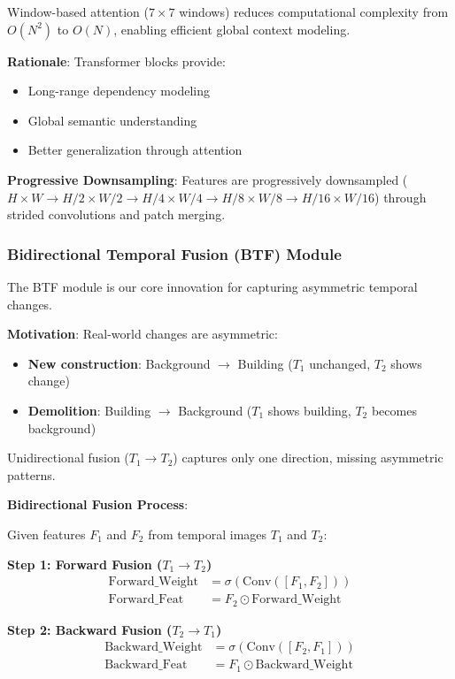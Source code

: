 \documentclass[journal]{IEEEtran}
\begin{document}
Window-based attention ($7 \times 7$ windows) reduces computational complexity from $O(N^2)$ to $O(N)$, enabling efficient global context modeling.

\textbf{Rationale}: Transformer blocks provide:
\begin{itemize}
    \item Long-range dependency modeling
    \item Global semantic understanding
    \item Better generalization through attention
\end{itemize}

\textbf{Progressive Downsampling}: Features are progressively downsampled ($H \times W \rightarrow H/2 \times W/2 \rightarrow H/4 \times W/4 \rightarrow H/8 \times W/8 \rightarrow H/16 \times W/16$) through strided convolutions and patch merging.

\subsubsection{Bidirectional Temporal Fusion (BTF) Module}

The BTF module is our core innovation for capturing asymmetric temporal changes.

\textbf{Motivation}: Real-world changes are asymmetric:
\begin{itemize}
    \item \textbf{New construction}: Background $\rightarrow$ Building ($T_1$ unchanged, $T_2$ shows change)
    \item \textbf{Demolition}: Building $\rightarrow$ Background ($T_1$ shows building, $T_2$ becomes background)
\end{itemize}

Unidirectional fusion ($T_1 \rightarrow T_2$) captures only one direction, missing asymmetric patterns.

\textbf{Bidirectional Fusion Process}:

Given features $F_1$ and $F_2$ from temporal images $T_1$ and $T_2$:

\textbf{Step 1: Forward Fusion ($T_1 \rightarrow T_2$)}
\begin{align}
\text{Forward\_Weight} &= \sigma(\text{Conv}([F_1, F_2])) \\
\text{Forward\_Feat} &= F_2 \odot \text{Forward\_Weight}
\end{align}

\textbf{Step 2: Backward Fusion ($T_2 \rightarrow T_1$)}
\begin{align}
\text{Backward\_Weight} &= \sigma(\text{Conv}([F_2, F_1])) \\
\text{Backward\_Feat} &= F_1 \odot \text{Backward\_Weight}
\end{align}
\end{document}
